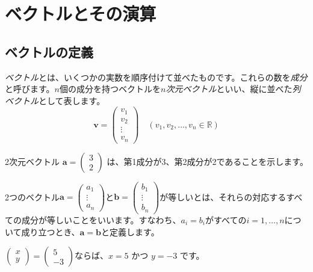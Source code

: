 \section{ベクトルとその演算}

\subsection{ベクトルの定義}

\emph{ベクトル}とは、いくつかの実数を順序付けて並べたものです。これらの数を\emph{成分}と呼びます。$n$個の成分を持つベクトルを\emph{$n$次元ベクトル}といい、縦に並べた\emph{列ベクトル}として表します。
\[\bm{v} = \begin{pmatrix} v_1 \\ v_2 \\ \vdots \\ v_n \end{pmatrix} \quad (v_1, v_2,\ldots,v_n\in\mathbb{R})\]

\begin{ex}
2次元ベクトル $\bm{a} = \begin{pmatrix} 3 \\ 2 \end{pmatrix}$ は、第1成分が3、第2成分が2であることを示します。
\end{ex}

\begin{dfn}[ベクトルの等しさ] \label{vector_equality}
2つのベクトル$\bm{a}=\begin{pmatrix} a_1 \\ \vdots \\ a_n \end{pmatrix}$と$\bm{b}=\begin{pmatrix} b_1 \\ \vdots \\ b_n \end{pmatrix}$が等しいとは、それらの対応するすべての成分が等しいことをいいます。すなわち、$a_i=b_i$がすべての$i=1,\ldots,n$について成り立つとき、$\bm{a}=\bm{b}$と定義します。
\end{dfn}

\begin{ex}
$\begin{pmatrix} x \\ y \end{pmatrix} = \begin{pmatrix} 5 \\ -3 \end{pmatrix}$ならば、$x=5$ かつ $y=−3$ です。
\end{ex}

